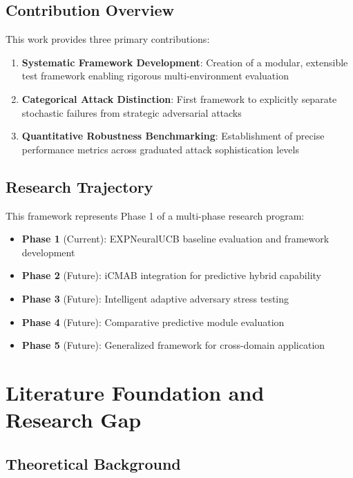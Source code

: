 \documentclass[11pt,a4paper]{article}
\begin{document}
\subsection{Contribution Overview}

This work provides three primary contributions:

\begin{enumerate}
\item \textbf{Systematic Framework Development}: Creation of a modular, extensible test framework enabling rigorous multi-environment evaluation
\item \textbf{Categorical Attack Distinction}: First framework to explicitly separate stochastic failures from strategic adversarial attacks
\item \textbf{Quantitative Robustness Benchmarking}: Establishment of precise performance metrics across graduated attack sophistication levels
\end{enumerate}

\subsection{Research Trajectory}

This framework represents Phase 1 of a multi-phase research program:

\begin{itemize}
\item \textbf{Phase 1} (Current): EXPNeuralUCB baseline evaluation and framework development
\item \textbf{Phase 2} (Future): iCMAB integration for predictive hybrid capability
\item \textbf{Phase 3} (Future): Intelligent adaptive adversary stress testing
\item \textbf{Phase 4} (Future): Comparative predictive module evaluation
\item \textbf{Phase 5} (Future): Generalized framework for cross-domain application
\end{itemize}

\section{Literature Foundation and Research Gap}

\subsection{Theoretical Background}
\end{document}
